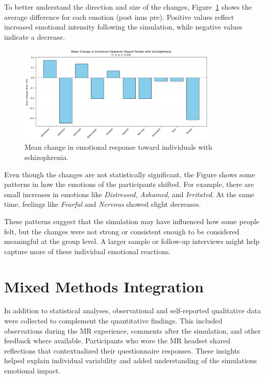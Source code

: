 \vspace{1em}

To better understand the direction and size of the changes, Figure~\ref{fig:emotion_change} shows the average difference for each emotion (post inus pre). Positive values reflect increased emotional intensity following the simulation, while negative values indicate a decrease.


\begin{figure}[H]
    \centering
    \includegraphics[width=0.85\textwidth]{../../Figures/mean-change-emotions.png}
    \caption{Mean change in emotional response toward individuals with schizophrenia.}
    \label{fig:emotion_change}
\end{figure}

Even though the changes are not statistically significant, the Figure shows some patterns in how the emotions of the participants shifted. For example, there are small increases in emotions like \textit{Distressed}, \textit{Ashamed}, and \textit{Irritated}. At the same time, feelings like \textit{Fearful} and \textit{Nervous} showed slight decreases.

\vspace{1em}

These patterns suggest that the simulation may have influenced how some people felt, but the changes were not strong or consistent enough to be considered meaningful at the group level. A larger sample or follow-up interviews might help capture more of these individual emotional reactions.

\section{Mixed Methods Integration}
In addition to statistical analyses, observational and self-reported qualitative data were collected to complement the quantitative findings. This included observations during the MR experience, comments after the simulation, and other feedback where available. Participants who wore the MR headset shared reflections that contextualized their questionnaire responses. These insights helped explain individual variability and added understanding of the simulations emotional impact.


